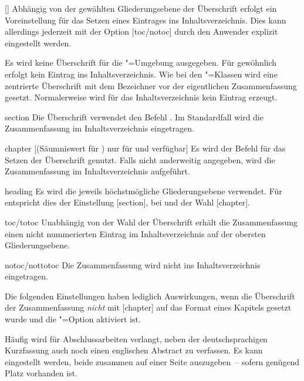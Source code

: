 \documentclass[%
  english,ngerman,%
  headings=optiontoheadandtoc,captions=tableheading,numbers=noenddot,%
  chapterpage,cdfoot,%
]{tudscrman}
\begin{document}
\begin{Declaration}{[\PSet]}
Abhängig von der gewählten Gliederungsebene der Überschrift erfolgt ein 
Voreinstellung für das Setzen eines Eintrages ins Inhaltsverzeichnis. Dies kann 
allerdings jederzeit mit der Option [toc/notoc] durch den 
Anwender explizit eingestellt werden.
%
\begin{values}
  Es wird keine Überschrift für die "=Umgebung ausgegeben.
  Für gewöhnlich erfolgt kein Eintrag ins Inhaltsverzeichnis.
  Wie bei den \KOMAScript"=Klassen wird eine zentrierte Überschrift mit dem 
  Bezeichner  vor der eigentlichen Zusammenfassung gesetzt.
  Normalerweise wird für das Inhaltsverzeichnis kein Eintrag erzeugt.
\item[section] Die Überschrift verwendet den Befehl . Im 
  Standardfall wird die Zusammenfassung im Inhaltsverzeichnis eingetragen.
\item[chapter][(Säumniswert für \Class*{tudscrbook})
  nur für \Class*{tudscrreprt} und \Class*{tudscrbook} verfügbar]
  Es wird der Befehl  für das Setzen der Überschrift genutzt. 
  Falls nicht anderweitig angegeben, wird die Zusammenfassung im 
  Inhaltsverzeichnis aufgeführt.
\item[heading] Es wird die jeweils höchstmögliche Gliederungsebene verwendet.
  Für  entspricht dies der Einstellung 
  [section], bei  und    
  der Wahl [chapter].
\item[toc/totoc]
  Unabhängig von der Wahl der Überschrift erhält die Zusammenfassung einen nicht
  nummerierten Eintrag im Inhaltsverzeichnis auf der obersten Gliederungsebene. 
\item[notoc/nottotoc]
  Die Zusammenfassung wird nicht ins Inhaltsverzeichnis eingetragen.
\end{values}
%
Die folgenden Einstellungen haben lediglich Auswirkungen, wenn die Überschrift 
der Zusammenfassung \emph{nicht} mit [chapter] auf das Format 
eines Kapitels gesetzt wurde und die "=Option aktiviert ist.

Häufig wird für Abschlussarbeiten verlangt, neben der deutschsprachigen 
Kurzfassung auch noch einen englischen Abstract zu verfassen. Es kann 
eingestellt werden, beide zusammen auf einer Seite auszugeben~-- sofern genügend 
Platz vorhanden ist.
  

\end{Declaration}
\end{document}
